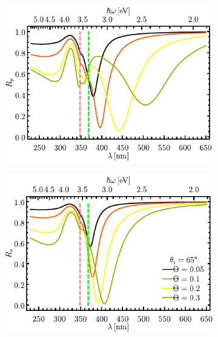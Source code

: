 \begin{figure}[h!]
	\hspace*{-1.5em}
	\begin{subfigure}{.01\linewidth}\caption{}\label{sfig:Ag-cutp}\vspace{4.5cm}\end{subfigure}
	\begin{subfigure}{.45\linewidth}\hspace*{-1.5em}
	\includegraphics[scale=1]{2-Resultados/figs/7-AgThetaVar/cut_angle_65_p.pdf}\end{subfigure}
	\begin{subfigure}{.01\linewidth}\caption{}\label{sfig:Ag-cuts}\vspace{4.5cm}\end{subfigure}\hspace*{-1.em}
	\begin{subfigure}{.45\linewidth}\centering
	\includegraphics[scale=1 ]{2-Resultados/figs/7-AgThetaVar/cut_angle_65_s.pdf}\end{subfigure}\vspace*{-.7em}

\end{figure}
